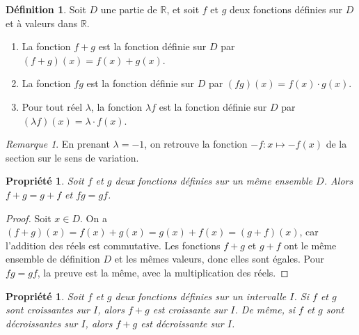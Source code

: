 \documentclass[12pt,a4paper]{article}
\theoremstyle{plain}
\newtheorem{property}[theorem]{Propriété}
\theoremstyle{definition}
\newtheorem{definition}[theorem]{Définition}
\theoremstyle{remark}
\newtheorem*{remark}{Remarque}
\begin{document}
\begin{tcolorbox}[navybar]
  \begin{definition}
    Soit $D$ une partie de $\mathbb{R}$, et soit $f$ et $g$ deux fonctions définies
    sur $D$ et à valeurs dans $\mathbb{R}$.
    \begin{enumerate}[label=(\roman*)]
      \item\label{def:somme} La fonction $f + g$ est la fonction définie sur $D$ par
      $(f + g)(x) = f(x) + g(x)$.
      \item\label{def:produit} La fonction $fg$ est la fonction définie sur $D$ par
      $(fg)(x) = f(x) \cdot g(x)$.
      \item\label{def:multiple} Pour tout réel $\lambda$, la fonction $\lambda f$ est la
      fonction définie sur $D$ par $(\lambda f)(x) = \lambda \cdot f(x)$.
    \end{enumerate}
  \end{definition}
\end{tcolorbox}

\begin{remark}
  En prenant $\lambda = -1$, on retrouve la fonction $-f : x \mapsto -f(x)$ de la
  section sur le sens de variation.
\end{remark}

\begin{tcolorbox}[graybar]
  \begin{property}
    Soit $f$ et $g$ deux fonctions définies sur un même ensemble $D$. Alors
    $f + g = g + f$ et $fg = gf$.
  \end{property}
\end{tcolorbox}

\begin{proof}
  Soit $x \in D$. On a $(f + g)(x) = f(x) + g(x) = g(x) + f(x) = (g + f)(x)$, car
  l'addition des réels est commutative. Les fonctions $f + g$ et $g + f$ ont le même
  ensemble de définition $D$ et les mêmes valeurs, donc elles sont égales. Pour
  $fg = gf$, la preuve est la même, avec la multiplication des réels.
\end{proof}

\begin{tcolorbox}[graybar]
  \begin{property}
    \label{prop:somme_monotone}
    Soit $f$ et $g$ deux fonctions définies sur un intervalle $I$. Si $f$ et $g$ sont
    croissantes sur $I$, alors $f + g$ est croissante sur $I$. De même, si $f$ et $g$
    sont décroissantes sur $I$, alors $f + g$ est décroissante sur $I$.
  \end{property}
\end{tcolorbox}
\end{document}
